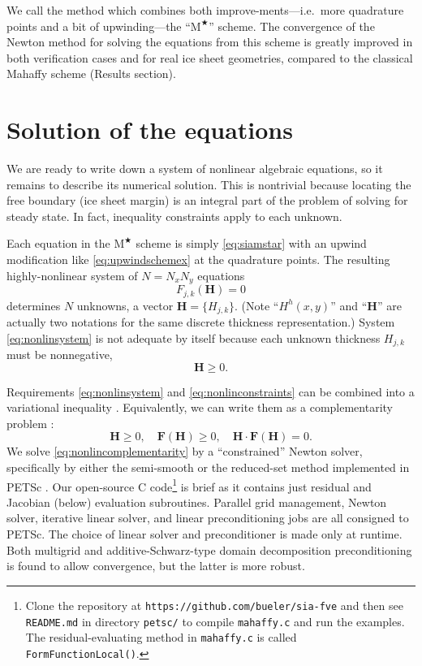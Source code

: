 \documentclass[twocolumn,letterpaper]{igs}
\newcommand\bF{\mathbf{F}}
\newcommand\bH{\mathbf{H}}
\newcommand{\Mstar}{$\text{M}^{\bigstar}$\xspace}
\begin{document}
We call the method which combines both improve-ments---i.e.~more quadrature points and a bit of upwinding---the ``\Mstar'' scheme.  The convergence of the Newton method for solving the equations from this scheme is greatly improved in both verification cases and for real ice sheet geometries, compared to the classical Mahaffy scheme (Results section).


\section{Solution of the equations} \label{sec:solution}

We are ready to write down a system of nonlinear algebraic equations, so it remains to describe its numerical solution.  This is nontrivial because locating the free boundary (ice sheet margin) is an integral part of the problem of solving for steady state.  In fact, inequality constraints apply to each unknown.

Each equation in the \Mstar scheme is simply \eqref{eq:siamstar} with an upwind modification like \eqref{eq:upwindschemex} at the quadrature points.  The resulting highly-nonlinear system of $N=N_x N_y$ equations
\begin{equation}
F_{j,k}(\bH) = 0   \label{eq:nonlinsystem}
\end{equation}
determines $N$ unknowns, a vector $\bH=\{H_{j,k}\}$.  (Note ``$H^h(x,y)$'' and ``$\bH$'' are actually two notations for the same discrete thickness representation.)  System \eqref{eq:nonlinsystem} is not adequate by itself because each unknown thickness $H_{j,k}$ must be nonnegative,
\begin{equation}
\bH \ge 0.  \label{eq:nonlinconstraints}
\end{equation}

Requirements \eqref{eq:nonlinsystem} and \eqref{eq:nonlinconstraints} can be combined into a variational inequality \citep{JouvetBueler2012,KinderlehrerStampacchia1980}.  Equivalently, we can write them as a complementarity problem \citep{BensonMunson2006}:
\begin{equation}
\bH \ge 0, \quad \bF(\bH) \ge 0, \quad \bH \cdot \bF(\bH) = 0.  \label{eq:nonlincomplementarity}
\end{equation}
We solve \eqref{eq:nonlincomplementarity} by a ``constrained'' Newton solver, specifically by either the semi-smooth or the reduced-set method \citep{BensonMunson2006} implemented in PETSc \citep{Balayetal2014}.  Our open-source C code\footnote{Clone the repository at \texttt{https://github.com/bueler/sia-fve} and then see \texttt{README.md} in directory \texttt{petsc/} to compile \texttt{mahaffy.c} and run the examples.  The residual-evaluating method in \texttt{mahaffy.c} is called \texttt{FormFunctionLocal()}.} is brief as it contains just residual and Jacobian (below) evaluation subroutines.  Parallel grid management, Newton solver, iterative linear solver, and linear preconditioning jobs are all consigned to PETSc.  The choice of linear solver and preconditioner is made only at runtime.  Both multigrid \citep{Briggsetal2000} and additive-Schwarz-type domain decomposition \citep{Smithetal1996} preconditioning is found to allow convergence, but the latter is more robust.
\end{document}
